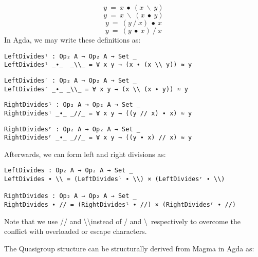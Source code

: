 \begin{equation} \label{eq_L-leftdivides}
y\ =\ x\ ∙\ (x\ \backslash\ y)
\end{equation}
\begin{equation} \label{eq_L-rightdivides}
y\ =\ x\ \backslash\ (x\ ∙\ y)
\end{equation}
\begin{equation} \label{eq_R-leftdivides}
y\ =\ (y\ /\ x)\ ∙\ x
\end{equation}
\begin{equation} \label{eq_Rirightdivides}
y\ =\ (y\ ∙\ x)\ /\ x
\end{equation}
In Agda, we may write these definitions as:
\begin{verbatim}
LeftDividesˡ : Op₂ A → Op₂ A → Set _
LeftDividesˡ _∙_  _\\_ = ∀ x y → (x ∙ (x \\ y)) ≈ y
\end{verbatim}
\begin{verbatim}
LeftDividesʳ : Op₂ A → Op₂ A → Set _
LeftDividesʳ _∙_ _\\_ = ∀ x y → (x \\ (x ∙ y)) ≈ y
\end{verbatim}
\begin{verbatim}
RightDividesˡ : Op₂ A → Op₂ A → Set _
RightDividesˡ _∙_ _//_ = ∀ x y → ((y // x) ∙ x) ≈ y
\end{verbatim}
\begin{verbatim}
RightDividesʳ : Op₂ A → Op₂ A → Set _
RightDividesʳ _∙_ _//_ = ∀ x y → ((y ∙ x) // x) ≈ y
\end{verbatim}

Afterwards, we can form left and right divisions as:

\begin{verbatim}
LeftDivides : Op₂ A → Op₂ A → Set _
LeftDivides ∙ \\ = (LeftDividesˡ ∙ \\) × (LeftDividesʳ ∙ \\)

RightDivides : Op₂ A → Op₂ A → Set _
RightDivides ∙ // = (RightDividesˡ ∙ //) × (RightDividesʳ ∙ //)
\end{verbatim}

Note that we use // and \textbackslash\textbackslash instead of / and
\textbackslash \ respectively to overcome the conflict with overloaded or escape
characters. 

The Quasigroup structure can be structurally derived from Magma in Agda as:

